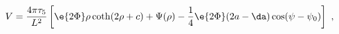 \begin{equation}
\label{V}
  V= \frac{4\pi \tau_5}{L^2} \left[ 
  \e{2\Phi} \rho \coth(2\rho+c) + \Psi(\rho) - \frac14 \e{2\Phi}(
  2a -\da) \cos(\psi-\psi_0) \right]~,
\end{equation}

